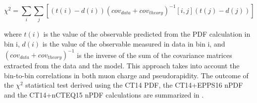 \begin{equation}
\chi^{2} = \sum_{i}\sum_{j}\left[\left(t(i) - d(i)\right)\left(cov_{data} + cov_{theory}\right)^{-1}[i , j]\left(t(j) - d(j)\right)\right]
\label{eq:Chi2Test}
\end{equation}

where $t(i)$ is the value of the observable predicted from the PDF calculation in bin i, $d(i)$ is the value of the observable measured in data in bin i, and $\left(cov_{data} + cov_{theory}\right)^{-1}$ is the inverse of the sum of the covariance matrices extracted from the data and the model. This approach takes into account the bin-to-bin correlations in both muon charge and pseudorapidity. The outcome of the $\chi^{2}$ statistical test derived using the CT14 PDF, the CT14+EPPS16 nPDF and the CT14+nCTEQ15 nPDF calculations are summarized in .








